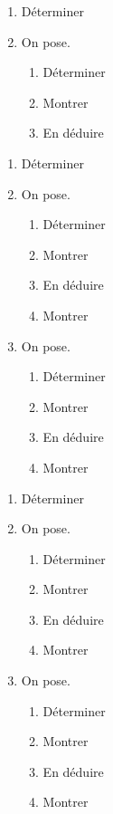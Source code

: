 \documentclass[12pt,a4paper]{report}
\begin{document}
	
	\begin{boxe}[black][Exercice $3$]
	
	\begin{enumerate}
		\item Déterminer 
		\item On pose.\begin{enumerate}
			\item Déterminer 
			\item Montrer 
			\item En déduire 
			
		\end{enumerate}
		
	\end{enumerate}
\end{boxe}
	
	
	

	\begin{boxe}[black][Exercice $4$]
	
	\begin{enumerate}
		\item Déterminer 
		\item On pose.\begin{enumerate}
			\item Déterminer 
			\item Montrer 
			\item En déduire 
			\item Montrer 
		\end{enumerate}
		\item On pose.
		\begin{enumerate}
			\item Déterminer 
			\item Montrer 
			\item En déduire 
			\item Montrer 
		\end{enumerate}
	\end{enumerate}
\end{boxe}

\begin{boxe}[black][Exercice $4$]
	
	\begin{enumerate}
		\item Déterminer 
		\item On pose.\begin{enumerate}
			\item Déterminer 
			\item Montrer 
			\item En déduire 
			\item Montrer 
		\end{enumerate}
		\item On pose.
		\begin{enumerate}
			\item Déterminer 
			\item Montrer 
			\item En déduire 
			\item Montrer 
		\end{enumerate}
	\end{enumerate}
\end{boxe}
\end{document}
